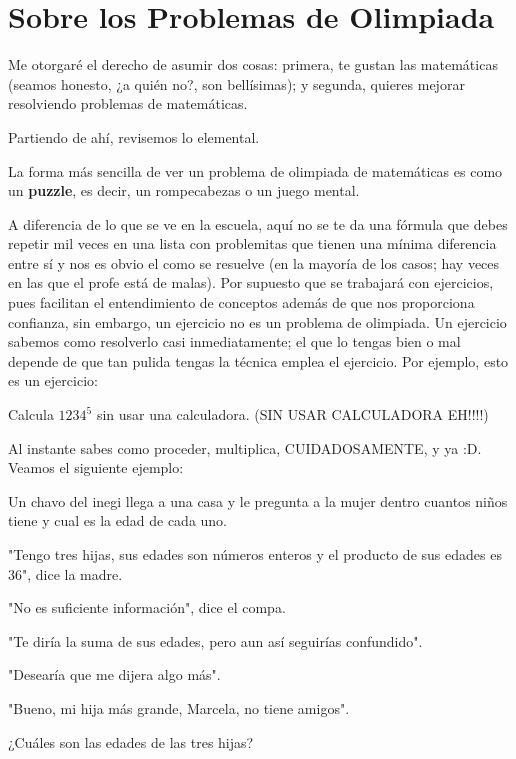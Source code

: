 \section{Sobre los Problemas de Olimpiada}

Me otorgaré el derecho de asumir dos cosas: primera, 
te gustan las matemáticas (seamos honesto, ¿a quién no?, son bellísimas);  
y segunda, quieres mejorar resolviendo problemas de matemáticas.

Partiendo de ahí, revisemos lo elemental.

La forma más sencilla de ver un problema de olimpiada de matemáticas 
es como un \textbf{puzzle}, es decir, un rompecabezas o un juego mental. 

A diferencia de lo que se ve en la escuela, 
aquí no se te da una fórmula que debes repetir mil veces en una lista 
con problemitas que tienen una mínima diferencia entre sí  
y nos es obvio el como se resuelve (en la mayoría de los casos; 
hay veces en las que el profe está de malas). Por supuesto que se 
trabajará con ejercicios, pues facilitan el entendimiento de conceptos 
además de que nos proporciona confianza, sin embargo, 
un ejercicio no es un problema de olimpiada. Un ejercicio sabemos como 
resolverlo casi inmediatamente; el que lo tengas bien o mal 
depende de que tan pulida tengas la técnica emplea el ejercicio. 
Por ejemplo, esto es un ejercicio:

\begin{example}
    Calcula $1234^5$ sin usar una calculadora. (SIN USAR CALCULADORA EH!!!!)
\end{example}

Al instante sabes como proceder, multiplica, CUIDADOSAMENTE, y ya :D.
Veamos el siguiente ejemplo:

\begin{example}
    Un chavo del inegi llega a una casa y le pregunta a la mujer dentro 
    cuantos niños tiene y cual es la edad de cada uno.

    "Tengo tres hijas, sus edades son números enteros y 
    el producto de sus edades es 36", dice la madre.

    "No es suficiente información", dice el compa.

    "Te diría la suma de sus edades, pero aun así seguirías confundido". 
    
    "Desearía que me dijera algo más".

    "Bueno, mi hija más grande, Marcela, no tiene amigos".

    ¿Cuáles son las edades de las tres hijas?
\end{example}

